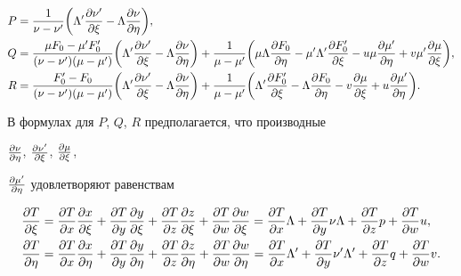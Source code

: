 \begin{align*} 


P&=\frac{1}{\nu-\nu'}\bigg(\Lambda'\myfrac{\nu'}{\xi} 


-\Lambda\myfrac{\nu}{\eta}\bigg),\\ 


% 


Q&=\frac{\mu F_0-\mu' F'_0}{(\nu-\nu')(\mu-\mu')} 


\bigg(\Lambda'\myfrac{\nu'}{\xi}-\Lambda\myfrac{\nu}{\eta} \bigg)+


\frac{1}{\mu-\mu'}\bigg(\mu\Lambda \myfrac{F_0}{\eta}- 


\mu'\Lambda'\myfrac{F'_0}{\xi}-u\mu 


\myfrac{\mu'}{\eta}+v\mu'\myfrac{\mu}{\xi} \bigg),\\ 


% 


R&=\frac{F'_0-F_0}{(\nu-\nu')(\mu-\mu')} 


\bigg(\Lambda'\myfrac{\nu'}{\xi}-\Lambda\myfrac{\nu}{\eta} \bigg)+


\frac{1}{\mu-\mu'}\bigg(\Lambda'\myfrac{F'_0}{\xi}- 


\Lambda\myfrac{F_0}{\eta}-v\myfrac{\mu}{\xi}+ 


u\myfrac{\mu'}{\eta} \bigg). 


\end{align*} 


В формулах для $P$, $Q$, $R$ предполагается, что производные 


$\frac{\partial \nu}{\partial \eta}$, $\frac{\partial \nu'}{\partial \xi}$, $\frac{\partial \mu}{\partial \xi}$, 


$\frac{\partial \mu'}{\partial \eta}$ удовлетворяют равенствам 


\begin{align*} 


\myfrac{T}{\xi}&=\myfrac{T}{x}\myfrac{x}{\xi}+ 


\myfrac{T}{y}\myfrac{y}{\xi}+\myfrac{T}{z}\myfrac{z}{\xi}+ 


\myfrac{T}{w}\myfrac{w}{\xi}=


\myfrac{T}{x}\Lambda+\myfrac{T}{y}\nu\Lambda+ 


\myfrac{T}{z}p+\myfrac{T}{w}u,\\ 


% 


\myfrac{T}{\eta}&=\myfrac{T}{x}\myfrac{x}{\eta}+ 


\myfrac{T}{y}\myfrac{y}{\eta}+\myfrac{T}{z}\myfrac{z}{\eta}+ 


\myfrac{T}{w}\myfrac{w}{\eta}=


\myfrac{T}{x}\Lambda'+\myfrac{T}{y}\nu'\Lambda' 


+\myfrac{T}{z}q+\myfrac{T}{w}v. 


\end{align*} 


